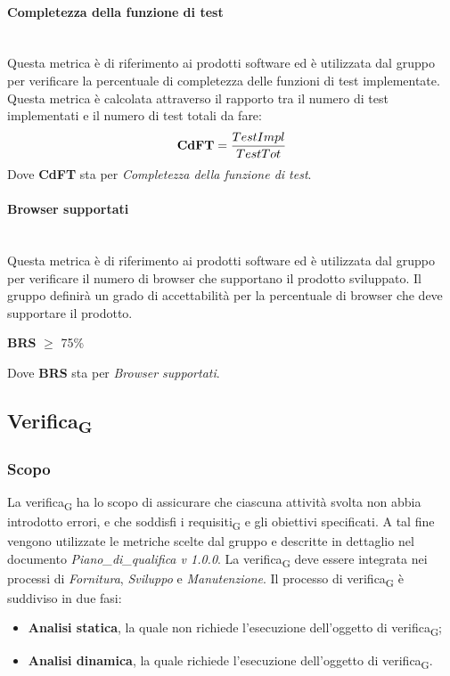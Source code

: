 \paragraph{Completezza della funzione di test}\mbox{}\\
Questa metrica è di riferimento ai prodotti software ed è utilizzata dal gruppo per verificare la percentuale di completezza delle funzioni di test implementate. Questa metrica è calcolata attraverso il rapporto tra il numero di test implementati e il numero di test totali da fare:
\begin{align*}
	\centering
	\textbf{CdFT} = \frac{TestImpl}{TestTot}
\end{align*}
Dove \textbf{CdFT} sta per \textit{Completezza della funzione di test}.
\paragraph{Browser supportati}\mbox{}\\
Questa metrica è di riferimento ai prodotti software ed è utilizzata dal gruppo per verificare il numero di browser che supportano il prodotto sviluppato. Il gruppo definirà un grado di accettabilità per la percentuale di browser che deve supportare il prodotto.
\begin{center}
	\textbf{BRS} $\geq$ 75\%
\end{center}
Dove \textbf{BRS} sta per \textit{Browser supportati}.

\subsection{Verifica\textsubscript{G}}
\subsubsection{Scopo}
La verifica\textsubscript{G} ha lo scopo di assicurare che ciascuna attività svolta non abbia introdotto errori, e che soddisfi i requisiti\textsubscript{G} e gli obiettivi specificati. A tal fine vengono utilizzate le metriche scelte dal gruppo e descritte in dettaglio nel documento \textit{Piano\_di\_qualifica v 1.0.0}.
La verifica\textsubscript{G} deve essere integrata nei processi di \textit{Fornitura}, \textit{Sviluppo} e \textit{Manutenzione}.
\newline
\newline
Il processo di verifica\textsubscript{G} è suddiviso in due fasi:
\begin{itemize}
	\item \textbf{Analisi statica}, la quale non richiede l'esecuzione dell'oggetto di verifica\textsubscript{G};
	\item \textbf{Analisi dinamica}, la quale richiede l'esecuzione dell'oggetto di verifica\textsubscript{G}.
\end{itemize}

